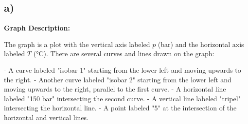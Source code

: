 

\subsection*{a)}

\textbf{Graph Description:}

The graph is a plot with the vertical axis labeled \( p \) (bar) and the horizontal axis labeled \( T \) (°C). There are several curves and lines drawn on the graph:

- A curve labeled "isobar 1" starting from the lower left and moving upwards to the right.
- Another curve labeled "isobar 2" starting from the lower left and moving upwards to the right, parallel to the first curve.
- A horizontal line labeled "150 bar" intersecting the second curve.
- A vertical line labeled "tripel" intersecting the horizontal line.
- A point labeled "5" at the intersection of the horizontal and vertical lines.